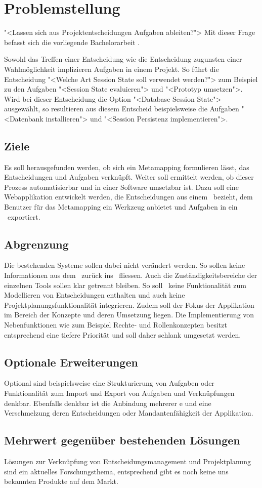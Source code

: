 \chapter{Problemstellung}
	"<Lassen sich aus Projektentscheidungen Aufgaben ableiten?">
	Mit dieser Frage befasst sich die vorliegende Bachelorarbeit \eeppi.
		
	Sowohl das Treffen einer Entscheidung wie die Entscheidung zugunsten einer Wahlmöglichkeit implizieren Aufgaben in einem Projekt.
	So führt die Entscheidung "<Welche Art Session State soll verwendet werden?"> zum Beispiel zu den Aufgaben
	"<Session State evaluieren"> und "<Prototyp umsetzen">.		
	Wird bei dieser Entscheidung die Option "<Database Session State"> ausgewählt,
	so resultieren aus diesem Entscheid beispielsweise die Aufgaben "<Datenbank installieren"> und "<Session Persistenz implementieren">.
	
	
	\section{Ziele}
	Es soll herausgefunden werden, ob sich ein Metamapping formulieren lässt,
	das Entscheidungen und Aufgaben verknüpft.
	Weiter soll ermittelt werden, ob dieser Prozess automatisierbar und in einer Software umsetzbar ist.
	Dazu soll eine Webapplikation entwickelt werden, die Entscheidungen aus einem \dks\ bezieht, 
	dem Benutzer für das Metamapping ein Werkzeug anbietet und Aufgaben in ein \ppt\ exportiert.
	
	
	\section{Abgrenzung}
	Die bestehenden Systeme sollen dabei nicht verändert werden. So sollen keine Informationen aus dem \ppt\ zurück ins \dks\ fliessen.
	Auch die Zuständigkeitsbereiche der einzelnen Tools sollen klar getrennt bleiben.
	So soll \eeppi\ keine Funktionalität zum Modellieren von Entscheidungen enthalten und auch keine Projektplanungsfunktionalität integrieren.
	Zudem soll der Fokus der Applikation im Bereich der Konzepte und deren Umsetzung liegen. Die Implementierung von Nebenfunktionen wie zum Beispiel Rechte- und Rollenkonzepten besitzt entsprechend eine tiefere Priorität und soll daher schlank umgesetzt werden.
	
	
	\section{Optionale Erweiterungen}
	Optional sind beispielsweise eine Strukturierung von Aufgaben oder Funktionalität zum Import und Export von Aufgaben und Verknüpfungen denkbar.	
	Ebenfalls denkbar ist die Anbindung mehrerer \dks e und eine Verschmelzung deren Entscheidungen oder Mandantenfähigkeit der Applikation.
	
	
	\section{Mehrwert gegenüber bestehenden Lösungen}
	Lösungen zur Verknüpfung von Entscheidungsmanagement und Projektplanung sind ein aktuelles Forschungsthema, 
	entsprechend gibt es noch keine uns bekannten Produkte auf dem Markt.
	 		
		
	